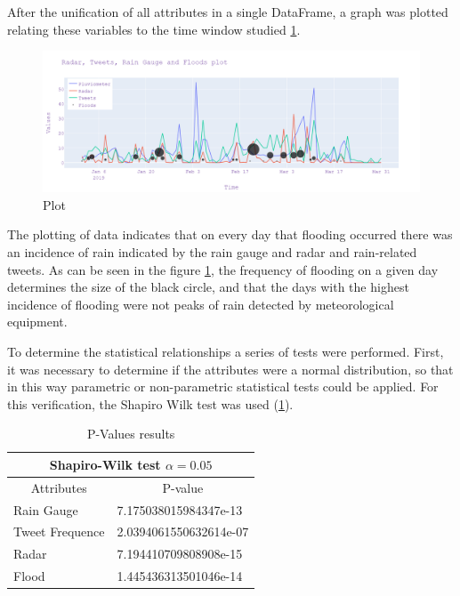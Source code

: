 After the unification of all attributes in a single DataFrame, a graph was plotted relating these variables to the time window studied \ref{fig:graph}.

\begin{figure}[H]
	\centering
	\includegraphics[width=1.2\textwidth]{figs/newplot.png}
	\caption{Plot}
	\label{fig:graph}
\end{figure}

The plotting of data indicates that on every day that flooding occurred there was an incidence of rain indicated by the rain gauge and radar and rain-related tweets. As can be seen in the figure \ref{fig:graph}, the frequency of flooding on a given day determines the size of the black circle, and that the days with the highest incidence of flooding were not peaks of rain detected by meteorological equipment.

To determine the statistical relationships a series of tests were performed. First, it was necessary to determine if the attributes were a normal distribution, so that in this way parametric or non-parametric statistical tests could be applied. For this verification, the Shapiro Wilk test was used (\ref{shapiro}).

\begin{table}[H]\label{shapiro}
	\caption{P-Values results}
	\begin{center}
	\begin{tabular}{ll}
		\hline
		\multicolumn{2}{c}{Shapiro-Wilk test $\alpha=0.05$}                              \\ \hline
		\multicolumn{1}{c|}{Attributes}      & \multicolumn{1}{c}{P-value} \\ \hline
		\multicolumn{1}{l|}{Rain Gauge}      & 7.175038015984347e-13       \\ \hline
		\multicolumn{1}{l|}{Tweet Frequence} & 2.0394061550632614e-07      \\ \hline
		\multicolumn{1}{l|}{Radar}           & 7.194410709808908e-15       \\ \hline
		\multicolumn{1}{l|}{Flood}           & 1.445436313501046e-14       \\ \hline
	\end{tabular}
\end{center}
\end{table}

